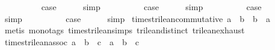 \begin{isabellebody}
\isanewline
\ \ \isamarkupfalse%
\ {\isachardoublequoteopen}{}{\isacharunderscore}{}{\isachardoublequoteclose}\isanewline
\ \ \isamarkupfalse%
\ \isamarkupfalse%
\ {\isacharquery}case\isanewline
\ \ \ \ \isamarkupfalse%
\ simp\isanewline
{}\isamarkupfalse%
\isanewline
\ \ \isamarkupfalse%
\ {\isachardoublequoteopen}{}{\isacharunderscore}{}{\isachardoublequoteclose}\isanewline
\ \ \isamarkupfalse%
\ \isamarkupfalse%
\ {\isacharquery}case\isanewline
\ \ \ \ \isamarkupfalse%
\ simp\isanewline
{}\isamarkupfalse%
\isanewline
\ \ \isamarkupfalse%
\ {}\isanewline
\ \ \isamarkupfalse%
\ \isamarkupfalse%
\ {\isacharquery}case\isanewline
\ \ \ \ \isamarkupfalse%
\ simp\isanewline
{}\isamarkupfalse%
\isanewline
\ \ \isamarkupfalse%
\ {}\isanewline
\ \ \isamarkupfalse%
\ \isamarkupfalse%
\ {\isacharquery}case\isanewline
\ \ \ \ \isamarkupfalse%
\ simp\isanewline
{}\isamarkupfalse%
%
\endisatagproof
{\isafoldproof}%
%
\isadelimproof
\isanewline
%
\endisadelimproof
\isanewline
{}\isamarkupfalse%
\ times{\isacharunderscore}trilean{\isacharunderscore}commutative{\isacharcolon}\ {\isachardoublequoteopen}a\ {\isasymand}\isactrlsub {\isacharquery}\ b\ {\isacharequal}\ b\ {\isasymand}\isactrlsub {\isacharquery}\ a{\isachardoublequoteclose}\isanewline
%
\isadelimproof
\ \ %
\endisadelimproof
%
\isatagproof
{}\isamarkupfalse%
\ {\isacharparenleft}metis\ {\isacharparenleft}mono{\isacharunderscore}tags{\isacharparenright}\ times{\isacharunderscore}trilean{\isachardot}simps\ trilean{\isachardot}distinct{\isacharparenleft}{}{\isacharparenright}\ trilean{\isachardot}exhaust{\isacharparenright}%
\endisatagproof
{\isafoldproof}%
%
\isadelimproof
\isanewline
%
\endisadelimproof
\isanewline
{}\isamarkupfalse%
\ times{\isacharunderscore}trilean{\isacharunderscore}assoc{\isacharcolon}\ {\isachardoublequoteopen}a\ {\isasymand}\isactrlsub {\isacharquery}\ b\ {\isasymand}\isactrlsub {\isacharquery}\ c\ {\isacharequal}\ a\ {\isasymand}\isactrlsub {\isacharquery}\ {\isacharparenleft}b\ {\isasymand}\isactrlsub {\isacharquery}\ c{\isacharparenright}{\isachardoublequoteclose}\isanewline
%
\isadelimproof
%
\endisadelimproof
%
\isatagproof
{}\isamarkupfalse%

\end{isabellebody}
